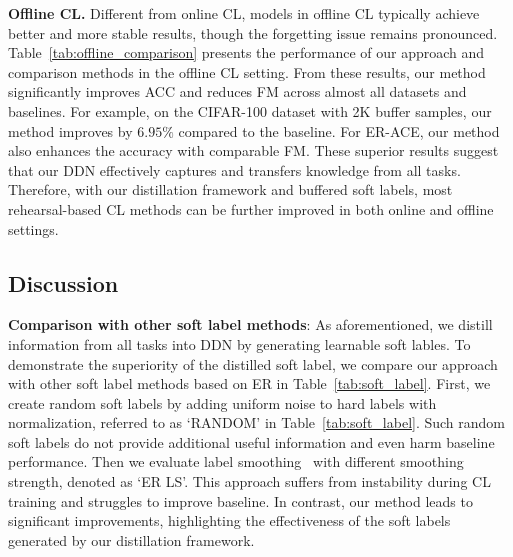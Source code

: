 \documentclass[table, xcdraw]{article}
\theoremstyle{plain}
\theoremstyle{definition}
\theoremstyle{remark}
\begin{document}
\textbf{Offline CL.} Different from online CL, models in offline CL typically achieve better and more stable results, though the forgetting issue remains pronounced. Table~\ref{tab:offline_comparison} presents the performance of our approach and comparison methods in the offline CL setting. From these results, our method significantly improves ACC and reduces FM across almost all datasets and baselines. For example, on the CIFAR-100 dataset with 2K buffer samples, our method improves by $6.95\%$ compared to the baseline. For ER-ACE, our method also enhances the accuracy with comparable FM. These superior results suggest that our DDN effectively captures and transfers knowledge from all tasks. Therefore, with our distillation framework and buffered soft labels, most rehearsal-based CL methods can be further improved in both online and offline settings.

\subsection{Discussion}
\textbf{Comparison with other soft label methods}:
As aforementioned, we distill information from all tasks into DDN by generating learnable soft lables. To demonstrate the superiority of the distilled soft label, we compare our approach with other soft label methods based on ER in Table~\ref{tab:soft_label}.
First, we create random soft labels by adding uniform noise to hard labels with normalization, referred to as `RANDOM' in Table~\ref{tab:soft_label}. Such random soft labels do not provide additional useful information and even harm baseline performance. Then we evaluate label smoothing~\cite{labelsmoothing} with different smoothing strength, denoted as `ER LS'. This approach suffers from instability during CL training and struggles to improve baseline. In contrast, our method leads to significant improvements, highlighting the effectiveness of the soft labels generated by our distillation framework.
\end{document}
